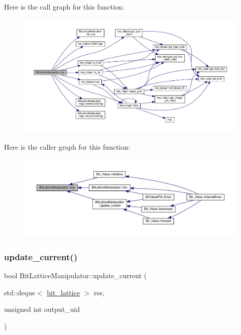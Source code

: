Here is the call graph for this function\+:
\nopagebreak
\begin{figure}[H]
\begin{center}
\leavevmode
\includegraphics[width=350pt]{dd/d98/classBitLatticeManipulator_a83eec7b71ec09cf4f2102efaaef3a1ad_cgraph}
\end{center}
\end{figure}
Here is the caller graph for this function\+:
\nopagebreak
\begin{figure}[H]
\begin{center}
\leavevmode
\includegraphics[width=350pt]{dd/d98/classBitLatticeManipulator_a83eec7b71ec09cf4f2102efaaef3a1ad_icgraph}
\end{center}
\end{figure}
\mbox{\label{classBitLatticeManipulator_a6bda5aa5bd5ef58340ad9b6db93643fa}} 
\subsubsection{\texorpdfstring{update\+\_\+current()}{update\_current()}}
{\footnotesize\ttfamily bool Bit\+Lattice\+Manipulator\+::update\+\_\+current (\begin{DoxyParamCaption}\item[{std\+::deque$<$ \hyperlink{bit__lattice_8hpp_ab732360111c810c4eaeb4c8b81d160d6}{bit\+\_\+lattice} $>$}]{res,  }\item[{unsigned int}]{output\+\_\+uid }\end{DoxyParamCaption})\hspace{0.3cm}{\ttfamily [protected]}}




